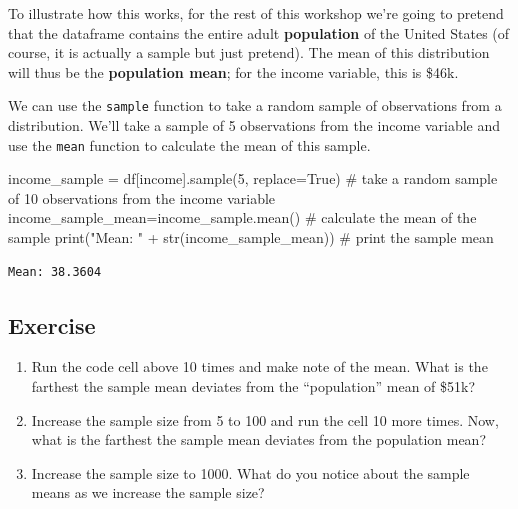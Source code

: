 \documentclass[
  letterpaper,
  DIV=11,
  numbers=noendperiod]{scrreprt}
\newenvironment{Shaded}{\begin{snugshade}}{\end{snugshade}}
\newcommand{\BuiltInTok}[1]{\textcolor[rgb]{0.00,0.23,0.31}{#1}}
\newcommand{\CommentTok}[1]{\textcolor[rgb]{0.37,0.37,0.37}{#1}}
\newcommand{\DecValTok}[1]{\textcolor[rgb]{0.68,0.00,0.00}{#1}}
\newcommand{\NormalTok}[1]{\textcolor[rgb]{0.00,0.23,0.31}{#1}}
\newcommand{\OperatorTok}[1]{\textcolor[rgb]{0.37,0.37,0.37}{#1}}
\newcommand{\StringTok}[1]{\textcolor[rgb]{0.13,0.47,0.30}{#1}}
\newcommand{\VariableTok}[1]{\textcolor[rgb]{0.07,0.07,0.07}{#1}}
\providecommand{\tightlist}{%
  \setlength{\itemsep}{0pt}\setlength{\parskip}{0pt}}\usepackage{longtable,booktabs,array}
\begin{document}
To illustrate how this works, for the rest of this workshop we're going
to pretend that the dataframe contains the entire adult
\textbf{population} of the United States (of course, it is actually a
sample but just pretend). The mean of this distribution will thus be the
\textbf{population mean}; for the income variable, this is \$46k.

We can use the \texttt{sample} function to take a random sample of
observations from a distribution. We'll take a sample of 5 observations
from the income variable and use the \texttt{mean} function to calculate
the mean of this sample.

\begin{Shaded}
\begin{Highlighting}[]
\NormalTok{income\_sample }\OperatorTok{=}\NormalTok{ df[}\StringTok{\textquotesingle{}income\textquotesingle{}}\NormalTok{].sample(}\DecValTok{5}\NormalTok{, replace}\OperatorTok{=}\VariableTok{True}\NormalTok{) }\CommentTok{\# take a random sample of 10 observations from the income variable}
\NormalTok{income\_sample\_mean}\OperatorTok{=}\NormalTok{income\_sample.mean() }\CommentTok{\# calculate the mean of the sample}
\BuiltInTok{print}\NormalTok{(}\StringTok{"Mean: "} \OperatorTok{+} \BuiltInTok{str}\NormalTok{(income\_sample\_mean)) }\CommentTok{\# print the sample mean}
\end{Highlighting}
\end{Shaded}

\begin{verbatim}
Mean: 38.3604
\end{verbatim}

\hypertarget{exercise-21}{%
\subsection{Exercise}\label{exercise-21}}

\begin{enumerate}
\def\labelenumi{\arabic{enumi}.}
\tightlist
\item
  Run the code cell above 10 times and make note of the mean. What is
  the farthest the sample mean deviates from the ``population'' mean of
  \$51k?
\item
  Increase the sample size from 5 to 100 and run the cell 10 more times.
  Now, what is the farthest the sample mean deviates from the population
  mean?
\item
  Increase the sample size to 1000. What do you notice about the sample
  means as we increase the sample size?
\end{enumerate}
\end{document}
